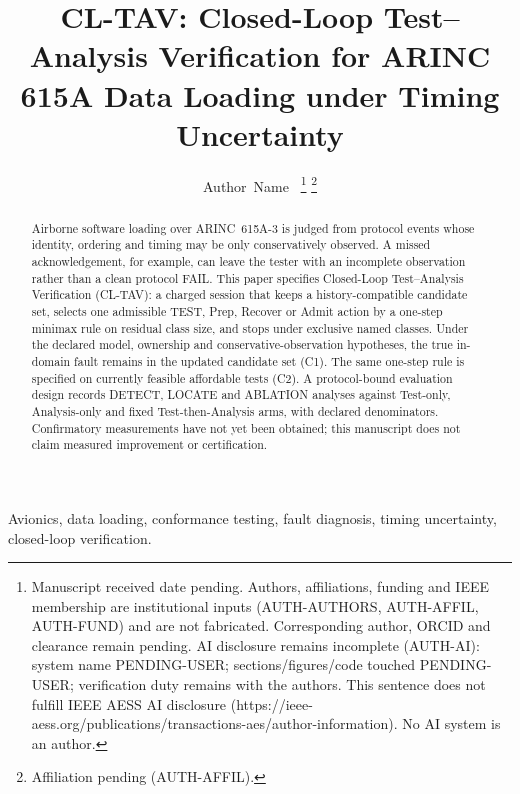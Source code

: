 \documentclass{IEEEtaes}
\title{CL-TAV: Closed-Loop Test--Analysis Verification for ARINC 615A Data Loading under Timing Uncertainty}
\author{Author~Name~\IEEEmembership{Membership pending}
\thanks{Manuscript received date pending. Authors, affiliations, funding and
IEEE membership are institutional inputs (AUTH-AUTHORS, AUTH-AFFIL, AUTH-FUND)
and are not fabricated. Corresponding author, ORCID and clearance remain
pending. AI disclosure remains incomplete (AUTH-AI): system name PENDING-USER;
sections/figures/code touched PENDING-USER; verification duty remains with the
authors. This sentence does not fulfill IEEE AESS AI disclosure
(https://ieee-aess.org/publications/transactions-aes/author-information).
No AI system is an author.}
\thanks{Affiliation pending (AUTH-AFFIL).}}
\begin{document}
\maketitle
{}

\begin{abstract}
Airborne software loading over ARINC~615A-3 is judged from protocol events
whose identity, ordering and timing may be only conservatively observed. A
missed acknowledgement, for example, can leave the tester with an incomplete
observation rather than a clean protocol FAIL. This paper specifies
Closed-Loop Test--Analysis Verification (CL-TAV): a charged session that
keeps a history-compatible candidate set, selects one admissible TEST, Prep,
Recover or Admit action by a one-step minimax rule on residual class size,
and stops under exclusive named classes. Under the declared model, ownership
and conservative-observation hypotheses, the true in-domain fault remains in
the updated candidate set (C1). The same one-step rule is specified on
currently feasible affordable tests (C2). A protocol-bound evaluation design
records DETECT, LOCATE and ABLATION analyses against Test-only,
Analysis-only and fixed Test-then-Analysis arms, with declared denominators.
Confirmatory measurements have not yet been obtained; this manuscript does
not claim measured improvement or certification.
\end{abstract}

\begin{IEEEkeywords}
Avionics, data loading, conformance testing, fault diagnosis, timing
uncertainty, closed-loop verification.
\end{IEEEkeywords}












\end{document}
